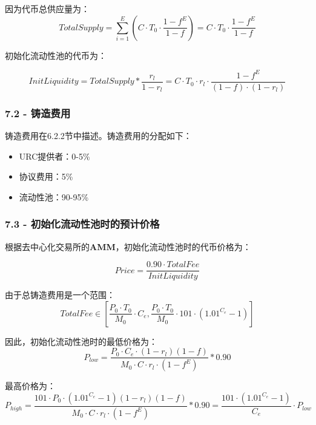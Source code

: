 \documentclass[
]{article}
\providecommand{\tightlist}{%
  \setlength{\itemsep}{0pt}\setlength{\parskip}{0pt}}
\begin{document}
因为代币总供应量为： \begin{equation}
TotalSupply = \sum_{i=1}^{E}(C \cdot T_0 \cdot \frac{1-f^{E}}{1-f})=C \cdot T_0 \cdot \frac{1-f^{E}}{1-f}
\end{equation}

初始化流动性池的代币为：

\begin{equation}
InitLiquidity = TotalSupply * \frac{r_l}{1-r_l} = C \cdot T_0 \cdot r_l \cdot \frac{1-f^{E}}{(1-f) \cdot (1-r_l)}
\end{equation}

\subsubsection{7.2 - 铸造费用}\label{ux94f8ux9020ux8d39ux7528}

铸造费用在6.2.2节中描述。铸造费用的分配如下：

\begin{itemize}
\tightlist
\item
  URC提供者：0-5\%
\item
  协议费用：5\%
\item
  流动性池：90-95\%
\end{itemize}

\subsubsection{7.3 -
初始化流动性池时的预计价格}\label{ux521dux59cbux5316ux6d41ux52a8ux6027ux6c60ux65f6ux7684ux9884ux8ba1ux4ef7ux683c}

根据去中心化交易所的\textbf{AMM}，初始化流动性池时的代币价格为：

\begin{equation}
Price = \frac{0.90 \cdot TotalFee}{InitLiquidity}
\end{equation}

由于总铸造费用是一个范围： \begin{equation}
TotalFee \in [\frac{P_0 \cdot T_0}{M_0} \cdot C_e, \frac{P_0 \cdot T_0}{M_0} \cdot 101 \cdot (1.01^{C_e}-1)]
\end{equation}

因此，初始化流动性池时的最低价格为： \begin{equation}
P_{low} = \frac{P_0 \cdot C_e \cdot (1-r_l)(1-f)}{M_0 \cdot C \cdot r_l \cdot (1-f^E)}*0.90
\end{equation}

最高价格为： \begin{equation}
P_{high} = \frac{101 \cdot P_0 \cdot (1.01^{C_e}-1)(1-r_l)(1-f)}{M_0 \cdot C \cdot r_l \cdot (1-f^E)}*0.90=\frac{101 \cdot (1.01^{C_e}-1)}{C_e} \cdot P_{low}
\end{equation}
\end{document}
